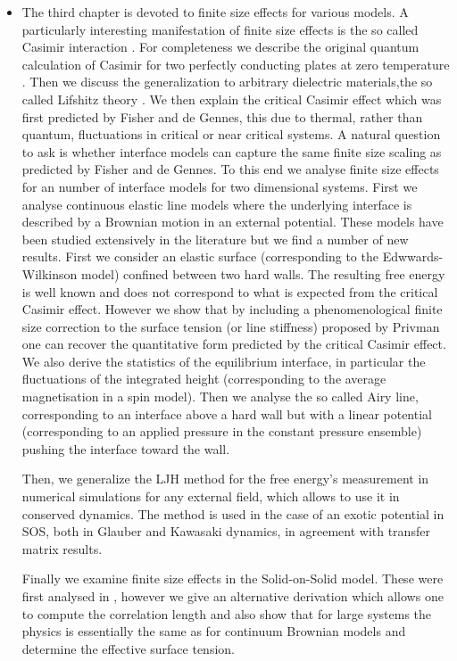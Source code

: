 \begin{itemize}
    \item The third chapter is devoted to finite size effects for various models. A particularly interesting manifestation of finite size effects is the so called Casimir interaction \cite{kimball_a_milton_casimir_2001}. For completeness we describe the original quantum calculation of Casimir for two perfectly conducting plates at zero temperature \cite{h_b_g_casimir_attraction_1948}. Then we discuss the generalization to arbitrary  dielectric materials,the so called Lifshitz theory \cite{lifshits_theory_1955}. We then explain the critical Casimir effect which was first predicted by Fisher and de Gennes, this due to thermal, rather than quantum, fluctuations in critical or near critical systems. A natural question to ask is whether interface models can capture the same finite size scaling as predicted by Fisher and de Gennes. To this end we analyse finite size effects for an number of interface models for two dimensional systems. First we analyse continuous elastic line models where the underlying interface is described by a Brownian motion in an external potential. These models have been studied extensively in the literature but we find a number of new results. First we consider an elastic surface (corresponding to the Edwwards-Wilkinson model) confined between two hard walls. The resulting free energy is well known and does not correspond to what is expected from the critical Casimir effect. However we show that by including a phenomenological finite size correction to the surface tension (or line stiffness) proposed by Privman \cite{privman_finite-size_1988-1} one can recover the quantitative form predicted by the critical Casimir effect. 
We also derive the statistics of the equilibrium interface, in particular the fluctuations of the integrated height (corresponding to the average magnetisation in a spin model). 
Then we analyse the so called Airy line, corresponding to an interface above a hard wall but with a linear potential (corresponding to an applied pressure in the constant pressure ensemble) pushing the interface toward the wall.

Then, we generalize the LJH method \cite{lopes_cardozo_critical_2014} for the free energy's measurement in numerical simulations for any external field, which allows to use it in conserved dynamics. The method is used in the case of an exotic potential in SOS, both in Glauber and Kawasaki dynamics, in agreement with transfer matrix results.

    Finally we examine finite size effects in the Solid-on-Solid model. These were first analysed in \cite{privman_finite-size_1988-1}, however we give an alternative derivation which allows one to compute the correlation length and also show that for large systems the physics is essentially the same as for continuum Brownian models and determine the effective surface tension.
    

\end{itemize}
